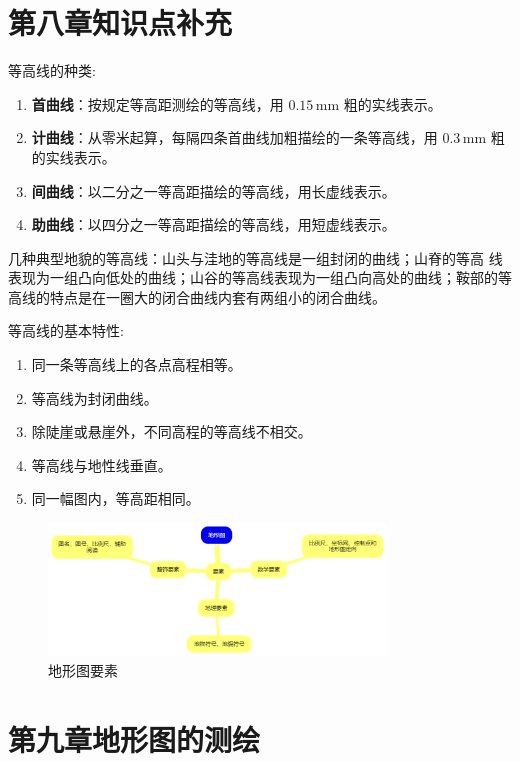 \documentclass[12pt,a4paper]{article}
\begin{document}
\section*{第八章\quad 知识点补充}
等高线的种类:

\begin{enumerate}
    \item \textbf{首曲线}：按规定等高距测绘的等高线，用 $0.15\,\mathrm{mm}$ 粗的实线表示。
    \item \textbf{计曲线}：从零米起算，每隔四条首曲线加粗描绘的一条等高线，用 $0.3\,\mathrm{mm}$ 粗的实线表示。
    \item \textbf{间曲线}：以二分之一等高距描绘的等高线，用长虚线表示。
    \item \textbf{助曲线}：以四分之一等高距描绘的等高线，用短虚线表示。
\end{enumerate}

几种典型地貌的等高线：山头与洼地的等高线是一组封闭的曲线；山脊的等高
线表现为一组凸向低处的曲线；山谷的等高线表现为一组凸向高处的曲线；鞍部的等
高线的特点是在一圈大的闭合曲线内套有两组小的闭合曲线。 

等高线的基本特性:

\begin{enumerate}
    \item 同一条等高线上的各点高程相等。
    \item 等高线为封闭曲线。
    \item 除陡崖或悬崖外，不同高程的等高线不相交。
    \item 等高线与地性线垂直。
    \item 同一幅图内，等高距相同。
\end{enumerate}

\begin{figure}[H]
    \centering
    \includegraphics[width=0.8\textwidth]{./figures/13.png}
    \caption{地形图要素}
\end{figure}
\newpage

\section*{第九章\quad 地形图的测绘}
\end{document}
